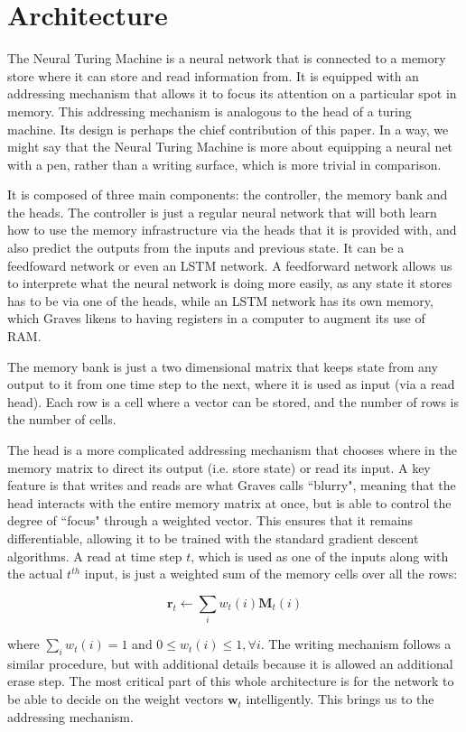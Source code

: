 \documentclass[12pt]{article}
\begin{document}
\section{Architecture}\label{architecture}

The Neural Turing Machine is a neural network that is connected to a
memory store where it can store and read information from.
It is equipped with an addressing mechanism that allows it to focus its
attention on a particular spot in memory. This addressing mechanism
is analogous to the head of a turing machine. Its design is perhaps the
chief contribution of this paper. In a way, we might say that the Neural
Turing Machine is more about equipping a neural net with a pen,
rather than a writing surface, which is more trivial in comparison.

It is composed of three main components: the controller, the memory bank and the heads.
The controller is just a regular neural network that will
both learn how to use the memory infrastructure via the heads that
it is provided with, and also predict the outputs
from the inputs and previous state. It can be a feedfoward network or
even an LSTM network. A feedforward network allows us to interprete
what the neural network is doing more easily, as any state it
stores has to be via one of the heads, while an LSTM network has
its own memory, which Graves likens to having registers in a computer to
augment its use of RAM.

The memory bank is just a two dimensional matrix that keeps state from
any output to it from one time step to the next, where it is used
as input (via a read head). Each row is a cell where a vector can be stored,
and the number of rows is the number of cells.

The head is a more
complicated addressing mechanism that chooses where in the memory matrix
to direct its output (i.e. store state) or read its input. A key feature is that writes
and reads are what Graves calls ``blurry", meaning that the head interacts
with the entire memory matrix at once, but is able to control the degree
of ``focus" through a weighted vector. This ensures that it remains differentiable, allowing it
to be trained with the standard gradient descent algorithms. A read at time
step $t$, which is used as one of the inputs along with the actual $t^{th}$
input, is just a weighted sum of the memory cells over all the rows:

$$
\mathbf{r}_t \leftarrow \sum_i w_t(i) \mathbf{M}_t(i)
$$

where $\sum_i w_t(i) = 1$ and $0 \le w_t(i) \le 1, \forall i$. The writing
mechanism follows a similar procedure, but with additional
details because it is allowed an additional erase step. The most critical part
of this whole architecture is for the network to be able to decide on the weight
vectors $\mathbf{w}_t$ intelligently. This brings us to the addressing mechanism.
\end{document}
